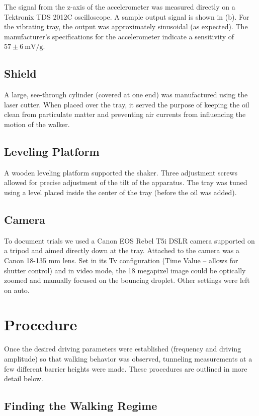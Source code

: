       The signal from the z-axis of the accelerometer was measured directly on a Tektronix TDS 2012C oscilloscope. A sample output signal is shown in (b). For the vibrating tray, the output was approximately sinusoidal (as expected). The manufacturer's specifications for the accelerometer indicate a sensitivity of $57 \pm 6~\mathrm{mV/g}$. 
    
\subsection{Shield}
    A large, see-through cylinder (covered at one end) was manufactured using the laser cutter. When placed over the tray, it served the purpose of keeping the oil clean from particulate matter and preventing air currents from influencing the motion of the walker.       
   
\subsection{Leveling Platform}
    A wooden leveling platform supported the shaker. Three adjustment screws allowed for precise adjustment of the tilt of the apparatus. The tray was tuned using a level placed inside the center of the tray (before the oil was added). 

\subsection{Camera}       
 
To document trials we used a Canon EOS Rebel T5i DSLR camera supported on a tripod and aimed directly down at the tray. Attached to the camera was a Canon 18-135 mm lens. Set in its Tv configuration (Time Value -- allows for shutter control) and in video mode, the 18 megapixel image could be optically zoomed and manually focused on the bouncing droplet. Other settings were left on auto.

\section{Procedure}
Once the desired driving parameters were established (frequency and driving amplitude) so that walking behavior was observed, tunneling measurements at a few different barrier heights were made. These procedures are outlined in more detail below.

\subsection{Finding the Walking Regime}

